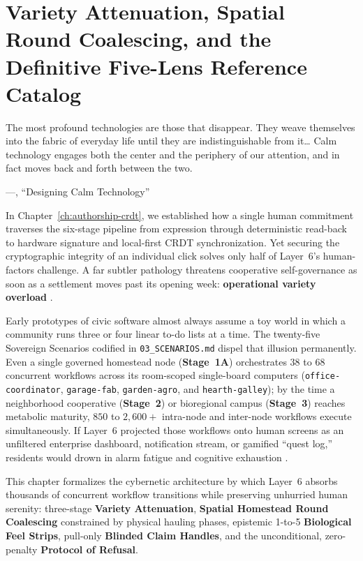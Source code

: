 \chapter{Variety Attenuation, Spatial Round Coalescing, and the Definitive Five-Lens Reference Catalog}
\label{ch:cognitive-triage}

\epigraph{The most profound technologies are those that disappear. They weave themselves into the fabric of everyday life until they are indistinguishable from it\ldots{} Calm technology engages both the center and the periphery of our attention, and in fact moves back and forth between the two.}{---\textcite{weiser1996calm}, ``Designing Calm Technology''}

In Chapter~\ref{ch:authorship-crdt}, we established how a single human commitment traverses the six-stage pipeline from expression through deterministic read-back to hardware signature and local-first CRDT synchronization. Yet securing the cryptographic integrity of an individual click solves only half of Layer~6's human-factors challenge. A far subtler pathology threatens cooperative self-governance as soon as a settlement moves past its opening week: \textbf{operational variety overload} \parencite{ashby1956,beer1979}.

Early prototypes of civic software almost always assume a toy world in which a community runs three or four linear to-do lists at a time. The twenty-five Sovereign Scenarios codified in \texttt{03\_SCENARIOS.md} dispel that illusion permanently. Even a single governed homestead node (\textbf{Stage~1A}) orchestrates $38$ to $68$ concurrent workflows across its room-scoped single-board computers (\texttt{office-coordinator}, \texttt{garage-fab}, \texttt{garden-agro}, and \texttt{hearth-galley}); by the time a neighborhood cooperative (\textbf{Stage~2}) or bioregional campus (\textbf{Stage~3}) reaches metabolic maturity, $850$ to $2{,}600+$ intra-node and inter-node workflows execute simultaneously. If Layer~6 projected those workflows onto human screens as an unfiltered enterprise dashboard, notification stream, or gamified ``quest log,'' residents would drown in alarm fatigue and cognitive exhaustion \parencite{miller1956magical,sweller1988cognitive,han2015}.

This chapter formalizes the cybernetic architecture by which Layer~6 absorbs thousands of concurrent workflow transitions while preserving unhurried human serenity: three-stage \textbf{Variety Attenuation}, \textbf{Spatial Homestead Round Coalescing} constrained by physical hauling phases, epistemic 1-to-5 \textbf{Biological Feel Strips}, pull-only \textbf{Blinded Claim Handles}, and the unconditional, zero-penalty \textbf{Protocol of Refusal}.

